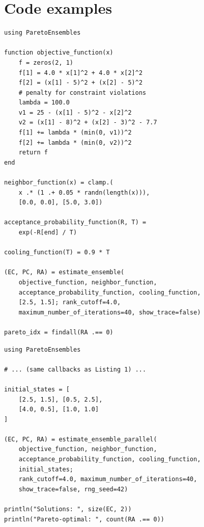 \documentclass[preprint,review,12pt]{elsarticle}
\begin{document}
\section{Code examples}\label{sec:si_code}

\begin{lstlisting}[caption={Binh--Korn benchmark with ParetoEnsembles.jl.},label={lst:binhkorn}]
using ParetoEnsembles

function objective_function(x)
    f = zeros(2, 1)
    f[1] = 4.0 * x[1]^2 + 4.0 * x[2]^2
    f[2] = (x[1] - 5)^2 + (x[2] - 5)^2
    # penalty for constraint violations
    lambda = 100.0
    v1 = 25 - (x[1] - 5)^2 - x[2]^2
    v2 = (x[1] - 8)^2 + (x[2] - 3)^2 - 7.7
    f[1] += lambda * (min(0, v1))^2
    f[2] += lambda * (min(0, v2))^2
    return f
end

neighbor_function(x) = clamp.(
    x .* (1 .+ 0.05 * randn(length(x))),
    [0.0, 0.0], [5.0, 3.0])

acceptance_probability_function(R, T) =
    exp(-R[end] / T)

cooling_function(T) = 0.9 * T

(EC, PC, RA) = estimate_ensemble(
    objective_function, neighbor_function,
    acceptance_probability_function, cooling_function,
    [2.5, 1.5]; rank_cutoff=4.0,
    maximum_number_of_iterations=40, show_trace=false)

pareto_idx = findall(RA .== 0)
\end{lstlisting}

\begin{lstlisting}[caption={Multi-chain parallel execution on the Binh--Korn problem (requires \texttt{julia -t4}).},label={lst:parallel}]
using ParetoEnsembles

# ... (same callbacks as Listing 1) ...

initial_states = [
    [2.5, 1.5], [0.5, 2.5],
    [4.0, 0.5], [1.0, 1.0]
]

(EC, PC, RA) = estimate_ensemble_parallel(
    objective_function, neighbor_function,
    acceptance_probability_function, cooling_function,
    initial_states;
    rank_cutoff=4.0, maximum_number_of_iterations=40,
    show_trace=false, rng_seed=42)

println("Solutions: ", size(EC, 2))
println("Pareto-optimal: ", count(RA .== 0))
\end{lstlisting}
\end{document}

